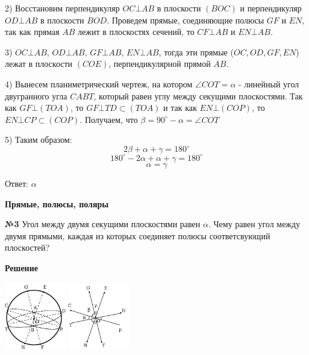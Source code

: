     2) Восстановим перпендикуляр $OC\bot AB$ в плоскости $(BOC)$ и перпендикуляр $OD \bot AB$ в плоскости $BOD$.
    Проведем прямые, соединяющие полюсы $GF$ и $EN$, так как прямая $AB$ лежит в плоскостях сечений,
    то $CF \bot AB$ и $EN \bot AB$.

    3) $OC \bot AB$, $OD \bot AB$, $GF \bot AB$, $EN \bot AB$,
    тогда эти прямые ($OC, OD, GF, EN$) лежат в плоскости $(COE)$, перпендикулярной прямой $AB$.

    4) Вынесем планиметрический чертеж, на котором $\angle COT = \alpha$ - линейный угол двугранного угла $CABT$,
    который равен углу между секущими плоскостями.
    Так как $GF \bot (TOA)$, то $GF \bot TD \subset (TOA)$ и так как $EN \bot (COP)$, то $EN \bot CP \subset (COP)$.
    Получаем, что $\beta = 90^\circ - \alpha = \angle COT$

    5) Таким образом:
    \[
        2\beta + \alpha + \gamma = 180^{\circ}
    \]
    \[
        180^{\circ} - 2\alpha + \alpha + \gamma = 180 ^{\circ}
    \]
    \[ \alpha = \gamma \]

    Ответ: $\alpha$\\


    \begin{center}
        \textbf{Прямые, полюсы, поляры}
    \end{center}

    \textbf{№3}
    Угол между двумя секущими плоскостями равен $\alpha$.
    Чему равен угол между двумя прямыми,
    каждая из которых соединяет полюсы соответсвующий плоскостей?

    \textbf{Решение}\\

    \begin{center}
        \includegraphics[width=0.2\textwidth]{images/img1} \quad
        \includegraphics[width=0.2\textwidth]{images/img2}\\
    \end{center}

